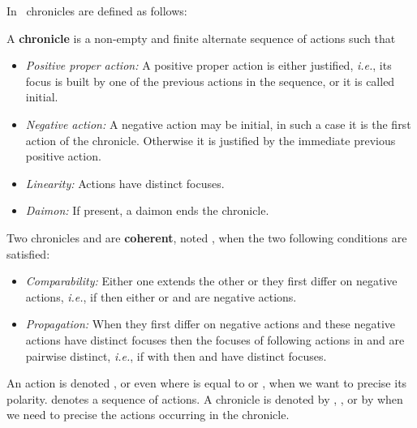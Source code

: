 \documentclass{LMCS}
\def\ie{{\em i.e.}}
\begin{document}
In~\cite{DBLP:journals/mscs/Girard01} chronicles are defined as follows:

\begin{defi}[Chronicle]
A {\bf chronicle}  is a non-empty and finite alternate sequence of actions such that
\begin{itemize}
\item {\em Positive proper action:} A  positive proper action is either justified, \ie, its focus is built by one of the previous actions in the sequence, or it is called initial. 
\item {\em Negative action:} A negative action may be initial, in such a case it is the first action of the chronicle. Otherwise it is justified by the immediate previous positive action.
\item {\em Linearity:} Actions have distinct focuses.
\item {\em Daimon:} If present, a daimon ends the chronicle. 
\end{itemize}
\end{defi}

\begin{defi}
Two chronicles  and  are {\bf coherent}, noted , when the two following conditions are satisfied:
\begin{itemize}
\item {\em Comparability:}  Either one extends the other or they first differ on negative actions, \ie, if  then either  or  and  are negative actions.
\item {\em Propagation:} When they first differ on negative actions and these negative actions have distinct focuses then the focuses of following actions in  and  are pairwise distinct, \ie, if  with  then  and  have distinct focuses.
\end{itemize}
\end{defi}

 An action is denoted ,  or even  where  is equal to  or , when we want to precise its polarity.  denotes a sequence of actions. A chronicle is denoted by , ,   or by  when we need to precise the actions occurring in the chronicle.\\
\end{document}
